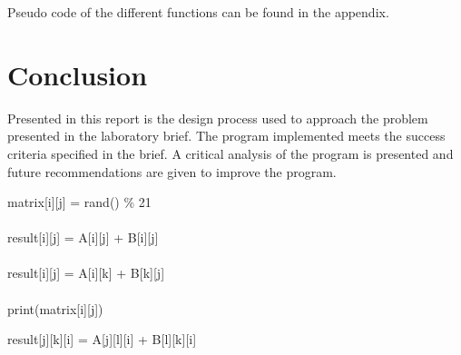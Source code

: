 \documentclass[a4paper, 11pt, onecolumn, conference]{IEEEtran}      %
\begin{document}
Pseudo code of the different functions can be found in the appendix.


\section{Conclusion}
Presented in this report is the design process used to approach the problem presented in the laboratory brief. The program implemented meets the success criteria specified in the brief. A critical analysis of the program is presented and future recommendations are given to improve the program.

\newpage
\appendix

\begin{algorithmic}


        matrix[i][j] = rand() \% 21
    \EndFor
\EndFor
\EndFunction \\ \\


        result[i][j] = A[i][j] + B[i][j] 
    \EndFor
\EndFor
\EndFunction \\ \\ 

        result[i][j] = A[i][k] + B[k][j] 
        \EndFor
    \EndFor
\EndFor
\EndFunction \\ \\

        print(matrix[i][j])
    \EndFor
\EndFor
\EndFunction


                 result[j][k][i] = A[j][l][i] + B[l][k][i] 
            \EndFor
        \EndFor
    \EndFor
\EndFor

\EndFunction

\end{algorithmic}
\end{document}
